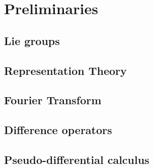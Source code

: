 \chapter{Preliminaries}
\label{chapter:preliminaries}

\section{Lie groups}

\section{Representation Theory}

\section{Fourier Transform}

\section{Difference operators}

\section{Pseudo-differential calculus}
